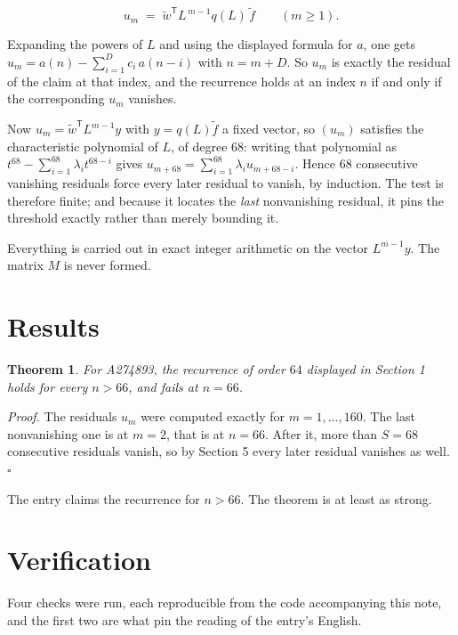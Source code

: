 \documentclass[11pt]{article}
\newtheorem{theorem}{Theorem}
\theoremstyle{definition}
\begin{document}
\[u_m \;=\; \tilde w^{\mathsf T} L^{\,m-1} q(L)\,\tilde f \qquad (m \ge 1).\]

Expanding the powers of $L$ and using the displayed formula for $a$, one gets $u_m = a(n) - \sum_{i=1}^{D} c_i\,a(n-i)$ with $n = m + D$. So $u_m$ is exactly the residual of the claim at that index, and the recurrence holds at an index $n$ if and only if the corresponding $u_m$ vanishes.

Now $u_m = \tilde w^{\mathsf T} L^{m-1} y$ with $y = q(L)\tilde f$ a fixed vector, so $(u_m)$ satisfies the characteristic polynomial of $L$, of degree $68$: writing that polynomial as $t^{68} - \sum_{i=1}^{68} \lambda_i t^{68-i}$ gives $u_{m+68} = \sum_{i=1}^{68} \lambda_i u_{m+68-i}$. Hence $68$ consecutive vanishing residuals force every later residual to vanish, by induction. The test is therefore finite; and because it locates the {\itshape last} nonvanishing residual, it pins the threshold exactly rather than merely bounding it.

Everything is carried out in exact integer arithmetic on the vector $L^{m-1}y$. The matrix $M$ is never formed.

\section{Results}

\begin{theorem} For A274893, the recurrence of order $64$ displayed in Section 1 holds for every $n > 66$, and fails at $n = 66$.\end{theorem}

{\itshape Proof.} The residuals $u_m$ were computed exactly for $m = 1,\dots,160$. The last nonvanishing one is at $m = 2$, that is at $n = 66$. After it, more than $S = 68$ consecutive residuals vanish, so by Section 5 every later residual vanishes as well. $\square$

The entry claims the recurrence for $n > 66$. The theorem is at least as strong.

\section{Verification}

Four checks were run, each reproducible from the code accompanying this note, and the first two are what pin the reading of the entry's English.
\end{document}
